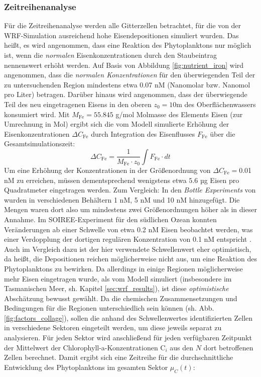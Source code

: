 \documentclass[12pt,a4paper,onecolumn]{scrartcl}
\begin{document}
\subsubsection{Zeitreihenanalyse} \label{sec:timeseries}
Für die Zeitreihenanalyse werden alle Gitterzellen betrachtet, für die von der WRF-Simulation ausreichend hohe Eisendepositionen simuliert wurden. Das heißt, es wird angenommen, dass eine Reaktion des Phytoplanktons nur möglich ist, wenn die \textit{normalen} Eisenkonzentrationen durch den Staubeintrag nennenswert erhöht werden. Auf Basis von Abbildung \ref{fig:nutrient_iron} wird angenommen, dass die \textit{normalen Konzentrationen} für den überwiegenden Teil der zu untersuchenden Region mindestens etwa 0.07 nM (Nanomolar bzw. Nanomol pro Liter) betragen. Darüber hinaus wird angenommen, dass der überwiegende Teil des neu eingetragenen Eisens in den oberen $z_0 = 10$m des Oberflächenwassers konsumiert wird. Mit  $M_{\text{Fe}} =  55.845$ g/mol Molmasse des Elements Eisen (zur Umrechnung in Mol) ergibt sich die vom Modell simulierte Erhöhung der Eisenkonzentrationen $\Delta C_\text{Fe}$ durch Integration des Eisenflusses $F_\text{Fe}$ über die Gesamtsimulationszeit:
\begin{equation}
\Delta C_\text{Fe} = \frac{1}{M_\text{Fe} \cdot z_0} \int F_\text{Fe} \cdot dt
\end{equation}
Um eine Erhöhung der Konzentrationen in der Größenordnung von $\Delta C_\text{Fe}=$0.01 nM zu erreichen, müssen dementsprechend wenigstens etwa $5.6$ µg Eisen pro Quadratmeter eingetragen werden. Zum Vergleich: In den \textit{Bottle Experiments} von \citet{Martin.1988} wurden in verschiedenen Behältern 1 nM, 5 nM und 10 nM hinzugefügt. Die Mengen waren dort also um mindestens zwei Größenordnungen höher als in dieser Annahme. Im SOIREE-Experiment für den südlichen Ozean \citep{Trull.2001} konnten Veränderungen ab einer Schwelle von etwa 0.2 nM Eisen beobachtet werden, was einer Verdopplung der dortigen regulären Konzentration von 0.1 nM entspricht \citep{Boyd.2010}. Auch im Vergleich dazu ist der hier verwendete Schwellenwert eher optimistisch, da heißt, die Depositionen reichen möglicherweise nicht aus, um eine Reaktion des Phytoplanktons zu bewirken. Da allerdings in einige Regionen möglicherweise mehr Eisen eingetragen wurde, als vom Modell simuliert (insbesondere im Tasmanischen Meer, sh. Kapitel \ref{sec:wrf_results}), ist diese \textit{optimistische} Abschätzung bewusst gewählt. Da die chemischen Zusammensetzungen und Bedingungen für die Regionen unterschiedlich sein können (sh. Abb. \ref{fig:factors_collage}), sollen die anhand des Schwellenwertes identifizierten Zellen in verschiedene Sektoren eingeteilt werden, um diese jeweils separat zu analysieren. Für jeden Sektor wird anschließend für jeden verfügbaren Zeitpunkt der Mittelwert der Chlorophyll-a-Konzentrationen $\text{C}_i$ aus den $N$ dort betroffenen Zellen berechnet. Damit ergibt sich eine Zeitreihe für die durchschnittliche Entwicklung des Phytoplanktons im gesamten Sektor $\mu_C(t)$:
\end{document}
